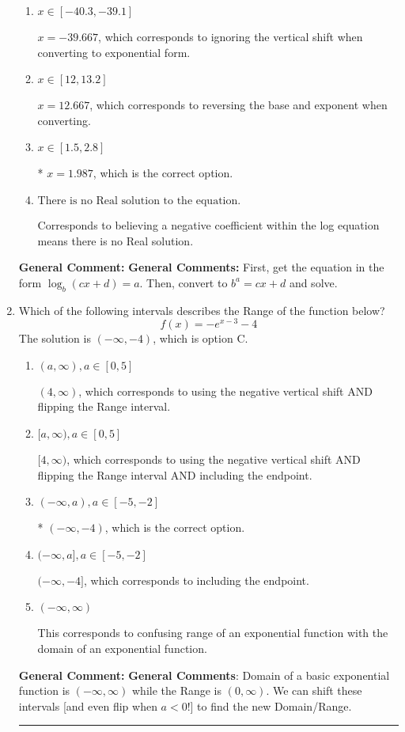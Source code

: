 \documentclass{extbook}[14pt]
\newcommand{\litem}[1]{\item #1

\rule{\textwidth}{0.4pt}}
\begin{document}
\begin{enumerate}
{\begin{enumerate}[label=\Alph*.]
$x = 8.667$, which corresponds to reversing the base and exponent when converting and reversing the value with $x$.
\item \( x \in [-40.3, -39.1] \)

$x = -39.667$, which corresponds to ignoring the vertical shift when converting to exponential form.
\item \( x \in [12, 13.2] \)

$x = 12.667$, which corresponds to reversing the base and exponent when converting.
\item \( x \in [1.5, 2.8] \)

* $x = 1.987$, which is the correct option.
\item \( \text{There is no Real solution to the equation.} \)

Corresponds to believing a negative coefficient within the log equation means there is no Real solution.
\end{enumerate}

\textbf{General Comment:} \textbf{General Comments:} First, get the equation in the form $\log_b{(cx+d)} = a$. Then, convert to $b^a = cx+d$ and solve.
}
\litem{
Which of the following intervals describes the Range of the function below?
\[ f(x) = -e^{x-3}-4 \]The solution is \( (-\infty, -4) \), which is option C.\begin{enumerate}[label=\Alph*.]
\item \( (a, \infty), a \in [0, 5] \)

$(4, \infty)$, which corresponds to using the negative vertical shift AND flipping the Range interval.
\item \( [a, \infty), a \in [0, 5] \)

$[4, \infty)$, which corresponds to using the negative vertical shift AND flipping the Range interval AND including the endpoint.
\item \( (-\infty, a), a \in [-5, -2] \)

* $(-\infty, -4)$, which is the correct option.
\item \( (-\infty, a], a \in [-5, -2] \)

$(-\infty, -4]$, which corresponds to including the endpoint.
\item \( (-\infty, \infty) \)

This corresponds to confusing range of an exponential function with the domain of an exponential function.
\end{enumerate}

\textbf{General Comment:} \textbf{General Comments}: Domain of a basic exponential function is $(-\infty, \infty)$ while the Range is $(0, \infty)$. We can shift these intervals [and even flip when $a<0$!] to find the new Domain/Range.
}
\end{enumerate}
\end{document}
